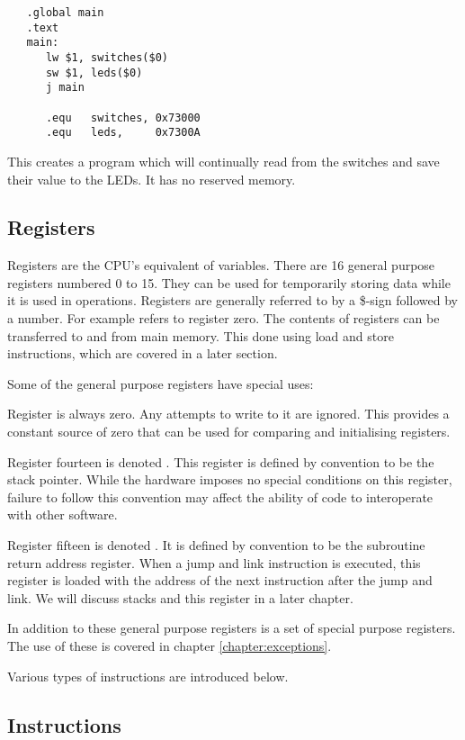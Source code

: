 \begin{verbatim}
   .global main
   .text
   main:
      lw $1, switches($0)
      sw $1, leds($0)
      j main

      .equ   switches, 0x73000
      .equ   leds,     0x7300A
\end{verbatim}

This creates a program which will continually read from the switches
and save their value to the LEDs. It has no reserved memory.

\subsection{Registers}
Registers are the CPU's equivalent of variables. There are 16 general
purpose registers numbered 0 to 15. They can be used for temporarily
storing data while it is used in operations. Registers are generally
referred to by a \$-sign followed by a number. For example 
refers to register zero. The contents of registers can be transferred
to and from main memory. This done using load and store instructions,
which are covered in a later section.

Some of the general purpose registers have special uses:

Register  is always zero. Any attempts to write to it are
ignored. This provides a constant source of zero that can be used for
comparing and initialising registers.

Register fourteen is denoted . This register is defined by
convention to be the stack pointer. While the hardware imposes no
special conditions on this register, failure to follow this convention
may affect the ability of code to interoperate with other software.

Register fifteen is denoted . It is defined by convention to
be the subroutine return address register. When a jump and link
instruction is executed, this register is loaded with the address of
the next instruction after the jump and link. We will discuss stacks
and this register in a later chapter.

In addition to these general purpose registers is a set of special
purpose registers. The use of these is covered in chapter
\ref{chapter:exceptions}.

Various types of instructions are introduced below.

\subsection{Instructions}

